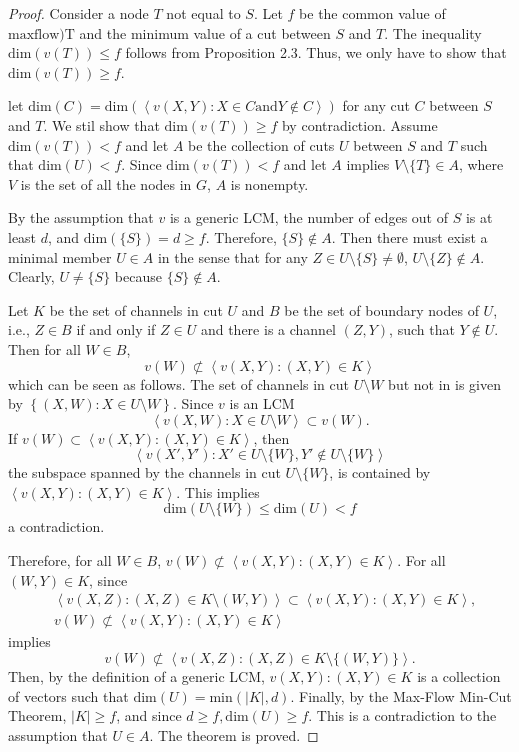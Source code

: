 \documentclass[journal]{IEEEtran}
\newtheorem*{proof}{\hskip 2em Proof}
\begin{document}
\begin{proof}
	Consider a node $T$ not equal to $S$. Let $f$ be the common value of $\text{maxflow){T}}$ and the minimum value of a cut between $S$ and $T$. The inequality $\text{dim}(v(T))\leq f$ follows from Proposition 2.3. Thus, we only have to show that $\text{dim}(v(T))\geq f$.
	\par let $\text{dim}(C)=\text{dim}(\left \langle v(X,Y):X\in C \text{and} Y\notin C\right \rangle)$ for any cut $C$ between $S$ and $T$. We stil show that $\text{dim}(v(T)) \geq f$ by contradiction. Assume $\text{dim}(v(T)) < f$ and let $A$ be the collection of cuts $U$ between $S$ and $T$ such that $\text{dim}(U)<f$. Since $\text{dim}(v(T)) < f$ and let $A$ implies $V\setminus \{T\}\in A$, where $V$ is the set of all the nodes in $G$, $A$ is nonempty.
	\par By the assumption that $v$ is a generic LCM, the number of edges out of $S$ is at least $d$, and $\text{dim}(\{S\})=d\geq f$. Therefore, $\{S\}\notin A$. Then there must exist a minimal member $U\in A$ in the sense that for any $Z\in U\setminus \{S\} \neq \emptyset$, $U\setminus \{Z\} \notin A$. Clearly, $U\neq \{S\}$ because $\{S\}\notin A$.
	\par Let $K$ be the set of channels in cut $U$ and $B$ be the set of boundary nodes of $U$, i.e., $Z\in B$ if and only if $Z\in U$ and there 	is a channel $(Z,Y)$, such that $Y\notin U$. Then for all $W\in B$,
	$$v(W)\nsubset \left \langle v(X,Y):(X,Y)\in K \right \rangle$$
	which can be seen as follows. The set of channels in cut $U\setminus {W}$ but not in is given by $\left \{ (X,W):X\in U\setminus{W}\right \}$. Since $v$ is an LCM
	$$\left \langle v(X,W): X\in U\setminus {W}\right \rangle \subset v(W).$$
	If $v(W)\subset \left \langle v(X,Y):(X,Y)\in K\right \rangle$, then
	$$\left \langle v(X',Y'):X'\in U\setminus \{W\},Y'\notin U\setminus \{W\}\right \rangle$$
	the subspace spanned by the channels in cut $U\setminus \{W\}$, is contained by $\left \langle v(X,Y):(X,Y)\in K\right \rangle$. This implies
	$$\text{dim}(U\setminus \{W\})\leq\text{dim}(U)<f$$
	a contradiction.
	\par Therefore, for all $W\in B$, $v(W)\nsubset \left \langle v(X,Y):(X,Y)\in K\right \rangle$. For all $(W,Y)\in K$, since
	\begin{align*}
	&\left \langle v(X,Z):(X,Z)\in K\setminus {(W,Y)}\right \rangle \subset \left \langle v(X,Y):(X,Y)\in K\right \rangle, \\
	&v(W)\nsubset \left \langle v(X,Y):(X,Y)\in K\right \rangle
	\end{align*}
	implies
	$$v(W)\nsubset \left \langle v(X,Z):(X,Z)\in K \setminus\{(W,Y)\}\right \rangle.$$
	Then, by the definition of a generic LCM, ${v(X,Y):(X,Y)\in K}$ is a collection of vectors such that $\text{dim}(U)=\text{min}(|K|,d)$. Finally, by the Max-Flow Min-Cut Theorem, $|K|\geq f$, and since $d\geq f,\text{dim}(U)\geq f$. This is a contradiction to the assumption that $U\in A$. The theorem is proved.
\end{proof}
\end{document}
